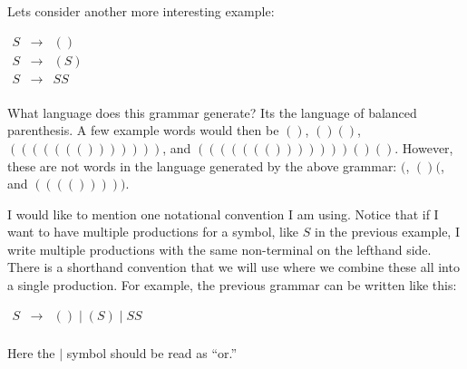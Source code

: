 \documentclass{article}
\begin{document}
Lets consider another more interesting example:
\begin{center}
  \begin{math}
    \begin{array}{llc}
      S & \to & ()\\      
      S & \to & (S)\\
      S & \to & SS\\      
    \end{array}
  \end{math}
\end{center}
What language does this grammar generate?  Its the language of
balanced parenthesis.  A few example words would then be $()$, $()()$,
$((((((()))))))$, and $((((((()))))))()()$.  However, these are not
words in the language generated by the above grammar: $($, $()($, and
$(((()))))$.

I would like to mention one notational convention I am using. Notice
that if I want to have multiple productions for a symbol, like $S$ in
the previous example, I write multiple productions with the same
non-terminal on the lefthand side.  There is a shorthand convention
that we will use where we combine these all into a single production.
For example, the previous grammar can be written like this:
\begin{center}
  \begin{math}
    \begin{array}{llc}
      S & \to & () \mid (S) \mid SS\\      
    \end{array}
  \end{math}
\end{center}
Here the $\mid$ symbol should be read as ``or.''
\end{document}
